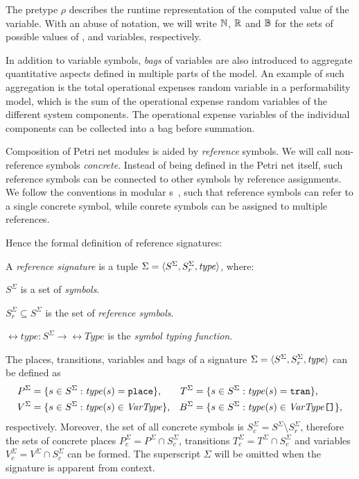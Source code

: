 The pretype \(\rho\) describes the runtime representation of the computed value of the variable. With an abuse of notation, we will write \(\mathbb{N}\), \(\mathbb{R}\) and \(\mathbb{B}\) for the sets of possible values of ,  and  variables, respectively.

In addition to variable symbols, \emph{bags} of variables are also introduced to aggregate quantitative aspects defined in multiple parts of the model. An example of such aggregation is the total operational expenses random variable in a performability model, which is the sum of the operational expense random variables of the different system components. The operational expense variables of the individual components can be collected into a bag before summation.

Composition of Petri net modules is aided by \emph{reference} symbols. We will call non-reference symbols \emph{concrete}. Instead of being defined in the Petri net itself, such reference symbols can be connected to other symbols by reference assignments. We follow the conventions in modular s~\citep{Kindler01modular}, such that reference symbols can refer to a single concrete symbol, while conrete symbols can be assigned to multiple references.

Hence the formal definition of reference  signatures:

\begin{dfn}
  A \emph{reference   signature} is a tuple \(\Sigma = \langle S^\Sigma, S_r^\Sigma, \textrm{\itshape type\/} \rangle\), where:
  \begin{compactitem}
  \item \(S^\Sigma\) is a set of \emph{symbols}.
  \item \(S_r^\Sigma \subseteq S^\Sigma\) is the set of \emph{reference symbols}.
  \item \(\rel{type}\colon S^\Sigma \to \rel{Type}\) is the \emph{symbol typing function}.
  \end{compactitem}
\end{dfn}

The places, transitions, variables and bags of a signature \(\Sigma = \langle S^\Sigma, S_r^\Sigma, \textrm{\itshape type\/} \rangle\) can be defined as
\begin{align}
  P^\Sigma &= \{s \in S^\Sigma : \textrm{\itshape type\/}(s) = \texttt{\upshape place}\}\text,
  &T^\Sigma &= \{s \in S^\Sigma : \textrm{\itshape type\/}(s) = \texttt{\upshape tran}\}\text, \\
  V^\Sigma &= \{s \in S^\Sigma : \textrm{\itshape type\/}(s) \in \textrm{\itshape VarType\/}\}\text,
  &B^\Sigma &= \{s \in S^\Sigma : \textrm{\itshape type\/}(s) \in \textrm{\itshape VarType\/}\mathclose{\texttt{[]}}\}\text,
\end{align}
respectively. Moreover, the set of all concrete symbols is \(S_c^\Sigma = S^\Sigma \setminus S_r^\Sigma\),
therefore the sets of concrete places \(P^\Sigma_c = P^\Sigma \cap S_c^\Sigma\), transitions \(T^\Sigma_c = T^\Sigma \cap S_c^\Sigma\) and variables \(V^\Sigma_c = V^\Sigma \cap S_c^\Sigma\) can be formed. The superscript \(\Sigma\) will be omitted when the signature is apparent from context.

